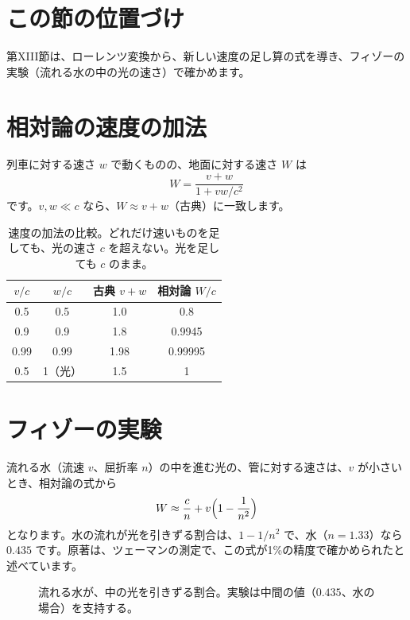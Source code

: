 \documentclass[a4paper,11pt,openany]{ltjsbook}
\begin{document}
\section{この節の位置づけ}

第XIII節は、ローレンツ変換から、新しい速度の足し算の式を導き、フィゾーの実験（流れる水の中の光の速さ）で確かめます。

\section{相対論の速度の加法}

列車に対する速さ $w$ で動くものの、地面に対する速さ $W$ は
\[
W=\frac{v+w}{1+vw/c^2}
\]
です。$v,w\ll c$ なら、$W\approx v+w$（古典）に一致します。

\begin{table}[htbp]
\centering
\begin{tabular}{ccc|c}
\toprule
$v/c$ & $w/c$ & 古典 $v+w$ & 相対論 $W/c$\\
\midrule
0.5 & 0.5 & 1.0 & 0.8\\
0.9 & 0.9 & 1.8 & 0.9945\\
0.99 & 0.99 & 1.98 & 0.99995\\
0.5 & 1（光） & 1.5 & 1\\
\bottomrule
\end{tabular}
\caption{速度の加法の比較。どれだけ速いものを足しても、光の速さ $c$ を超えない。光を足しても $c$ のまま。}
\end{table}

\section{フィゾーの実験}

流れる水（流速 $v$、屈折率 $n$）の中を進む光の、管に対する速さは、$v$ が小さいとき、相対論の式から
\[
W\approx\frac{c}{n}+v\Bigl(1-\frac1{n^2}\Bigr)
\]
となります。水の流れが光を引きずる割合は、$1-1/n^2$ で、水（$n=1.33$）なら $0.435$ です。原著は、ツェーマンの測定で、この式が1\%の精度で確かめられたと述べています。

\begin{figure}[htbp]
\centering
{}
\caption{流れる水が、中の光を引きずる割合。実験は中間の値（$0.435$、水の場合）を支持する。}
\end{figure}
\end{document}
